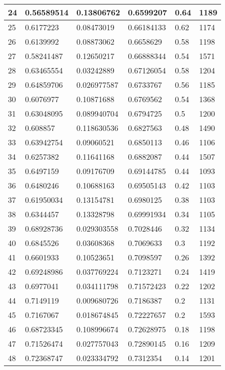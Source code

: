 \begin{longtable}{|l|l|l|l|l|l|}
24 & 0.56589514 & 0.13806762 & 0.6599207 & 0.64 & 1189 \\ \hline 
25 & 0.6177223 & 0.08473019 & 0.66184133 & 0.62 & 1174 \\ \hline 
26 & 0.6139992 & 0.08873062 & 0.6658629 & 0.58 & 1198 \\ \hline 
27 & 0.58241487 & 0.12650217 & 0.66888344 & 0.54 & 1571 \\ \hline 
28 & 0.63465554 & 0.03242889 & 0.67126054 & 0.58 & 1204 \\ \hline 
29 & 0.64859706 & 0.026977587 & 0.6733767 & 0.56 & 1185 \\ \hline 
30 & 0.6076977 & 0.10871688 & 0.6769562 & 0.54 & 1368 \\ \hline 
31 & 0.63048095 & 0.089940704 & 0.6794725 & 0.5 & 1200 \\ \hline 
32 & 0.608857 & 0.118630536 & 0.6827563 & 0.48 & 1490 \\ \hline 
33 & 0.63942754 & 0.09060521 & 0.6850113 & 0.46 & 1106 \\ \hline 
34 & 0.6257382 & 0.11641168 & 0.6882087 & 0.44 & 1507 \\ \hline 
35 & 0.6497159 & 0.09176709 & 0.69144785 & 0.44 & 1093 \\ \hline 
36 & 0.6480246 & 0.10688163 & 0.69505143 & 0.42 & 1103 \\ \hline 
37 & 0.61950034 & 0.13154781 & 0.6980125 & 0.38 & 1103 \\ \hline 
38 & 0.6344457 & 0.13328798 & 0.69991934 & 0.34 & 1105 \\ \hline 
39 & 0.68928736 & 0.029303558 & 0.7028446 & 0.32 & 1134 \\ \hline 
40 & 0.6845526 & 0.03608368 & 0.7069633 & 0.3 & 1192 \\ \hline 
41 & 0.6601933 & 0.10523651 & 0.7098597 & 0.26 & 1392 \\ \hline 
42 & 0.69248986 & 0.037769224 & 0.7123271 & 0.24 & 1419 \\ \hline 
43 & 0.6977041 & 0.034111798 & 0.71572423 & 0.22 & 1202 \\ \hline 
44 & 0.7149119 & 0.009680726 & 0.7186387 & 0.2 & 1131 \\ \hline 
45 & 0.7167067 & 0.018674845 & 0.72227657 & 0.2 & 1593 \\ \hline 
46 & 0.68723345 & 0.108996674 & 0.72628975 & 0.18 & 1198 \\ \hline 
47 & 0.71526474 & 0.027757043 & 0.72890145 & 0.16 & 1209 \\ \hline 
48 & 0.72368747 & 0.023334792 & 0.7312354 & 0.14 & 1201 \\ \hline 

\end{longtable}
